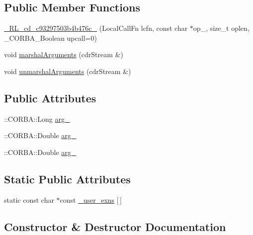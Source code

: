 \subsection*{Public Member Functions}
\begin{DoxyCompactItemize}
\item 
\hyperlink{class__0_r_l__cd__c93297503b4b476c__50000000_a0969c7fefe88982e32a15b255cbd6444}{\+\_\+R\+L\+\_\+cd\+\_\+c93297503b4b476c\+\_} (Local\+Call\+Fn lcfn, const char $\ast$op\+\_\+, size\+\_\+t oplen, \+\_\+\+C\+O\+R\+B\+A\+\_\+\+Boolean upcall=0)
\item 
void \hyperlink{class__0_r_l__cd__c93297503b4b476c__50000000_a555f809315838ca64716c409ff1cc821}{marshal\+Arguments} (cdr\+Stream \&)
\item 
void \hyperlink{class__0_r_l__cd__c93297503b4b476c__50000000_a81eb249414388136f92fd9f584475a77}{unmarshal\+Arguments} (cdr\+Stream \&)
\end{DoxyCompactItemize}
\subsection*{Public Attributes}
\begin{DoxyCompactItemize}
\item 
\+::C\+O\+R\+B\+A\+::\+Long \hyperlink{class__0_r_l__cd__c93297503b4b476c__50000000_adf874b79561a94362612a9a66efe8367}{arg\+\_}
\item 
\+::C\+O\+R\+B\+A\+::\+Double \hyperlink{class__0_r_l__cd__c93297503b4b476c__50000000_a47d6cd5ebcdbf217e29a25baba671df8}{arg\+\_}
\item 
\+::C\+O\+R\+B\+A\+::\+Double \hyperlink{class__0_r_l__cd__c93297503b4b476c__50000000_a6db84fccb3f773ae9dcf309b0b7e3682}{arg\+\_}
\end{DoxyCompactItemize}
\subsection*{Static Public Attributes}
\begin{DoxyCompactItemize}
\item 
static const char $\ast$const \hyperlink{class__0_r_l__cd__c93297503b4b476c__50000000_ab515d885d1083c80fcaf70a6878e41e6}{\+\_\+user\+\_\+exns} \mbox{[}$\,$\mbox{]}
\end{DoxyCompactItemize}


\subsection{Constructor \& Destructor Documentation}
